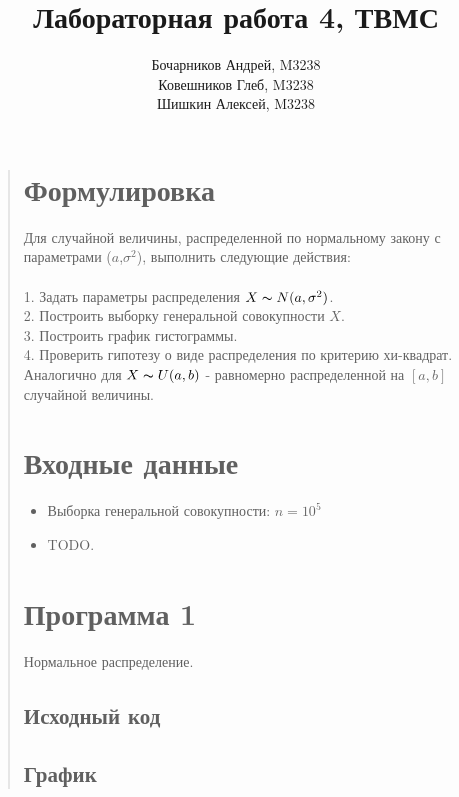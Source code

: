 \documentclass{article}
\begin{document}
\title{Лабораторная работа 4, ТВМС}
\author{
	Бочарников Андрей, M3238\\
	Ковешников Глеб, M3238\\
	Шишкин Алексей, M3238
}
\maketitle

\begin{quote}
\section{Формулировка}
	Для случайной величины, распределенной по нормальному закону с параметрами ($a$,$\sigma^2$), выполнить следующие действия:\\\\
	1. Задать параметры распределения $X \thicksim N(a, \sigma^2)$.\\
	2. Построить выборку генеральной совокупности $X$.\\
	3. Построить график гистограммы.\\
	4. Проверить гипотезу о виде распределения по критерию хи-квадрат.\\
	Аналогично для $X \thicksim U(a, b)$ - равномерно распределенной на $[a, b]$ случайной величины.
\section{Входные данные}
        \begin{itemize}
            \item Выборка генеральной совокупности: $n = 10^5$
            \item TODO.
        \end{itemize}
\section{Программа 1}
	Нормальное распределение.
\subsection{Исходный код}
        \begin{minipage}{\linewidth}
            
        \end{minipage}
\subsection{График}


\end{quote}
\end{document}
